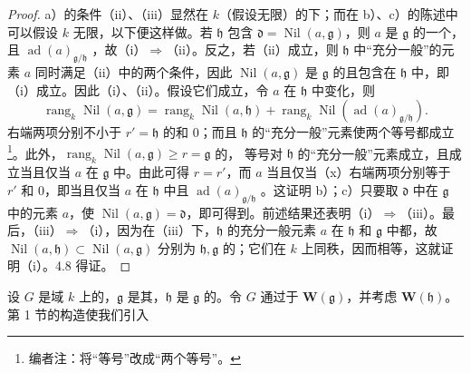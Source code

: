 \begin{proof}
a）的条件（ii）、（iii）显然在 $k$（假设无限）的下；而在 b）、c）的陈述中可以假设 $k$ 无限，以下便这样做。若 $\mathfrak h$ 包含 $\mathfrak d=\operatorname{Nil}(a,\mathfrak g)$，则 $a$ 是 $\mathfrak g$ 的一个，且 $\operatorname{ad}(a)_{\mathfrak g/\mathfrak h}$ ，故（i）$\Rightarrow$（ii）。反之，若（ii）成立，则 $\mathfrak h$ 中“充分一般”的元素 $a$ 同时满足（ii）中的两个条件，因此 $\operatorname{Nil}(a,\mathfrak g)$ 是 $\mathfrak g$ 的且包含在 $\mathfrak h$ 中，即（i）成立。因此（i）、（ii）。假设它们成立，令 $a$ 在 $\mathfrak h$ 中变化，则
\[\operatorname{rang}_k\operatorname{Nil}(a,\mathfrak g)=\operatorname{rang}_k\operatorname{Nil}(a,\mathfrak h)+\operatorname{rang}_k\operatorname{Nil}(\operatorname{ad}(a)_{\mathfrak g/\mathfrak h}).\tag{x}\]
右端两项分别不小于 $r'=\mathfrak h$ 的和 $0$；而且 $\mathfrak h$ 的“充分一般”元素使两个等号都成立\footnote{编者注：将“等号”改成“两个等号”。}。此外，$\operatorname{rang}_k\operatorname{Nil}(a,\mathfrak g)\geq r=\mathfrak g$ 的，
等号对 $\mathfrak h$ 的“充分一般”元素成立，且成立当且仅当 $a$ 在 $\mathfrak g$ 中。由此可得 $r=r'$，而 $a$ 当且仅当（x）右端两项分别等于 $r'$ 和 $0$，即当且仅当 $a$ 在 $\mathfrak h$ 中且 $\operatorname{ad}(a)_{\mathfrak g/\mathfrak h}$ 。这证明 b）；c）只要取 $\mathfrak d$ 中在 $\mathfrak g$ 中的元素 $a$，使 $\operatorname{Nil}(a,\mathfrak g)=\mathfrak d$，即可得到。前述结果还表明（i）$\Rightarrow$（iii）。最后，（iii）$\Rightarrow$（i），因为在（iii）下，$\mathfrak h$ 的充分一般元素 $a$ 在 $\mathfrak h$ 和 $\mathfrak g$ 中都，故 $\operatorname{Nil}(a,\mathfrak h)\subset\operatorname{Nil}(a,\mathfrak g)$ 分别为 $\mathfrak h,\mathfrak g$ 的；它们在 $k$ 上同秩，因而相等，这就证明（i）。4.8 得证。
\end{proof}
设 $G$ 是域 $k$ 上的，$\mathfrak g$ 是其，$\mathfrak h$ 是 $\mathfrak g$ 的。令 $G$ 通过于 $\mathbf W(\mathfrak g)$，并考虑 $\mathbf W(\mathfrak h)$。第 1 节的构造使我们引入

